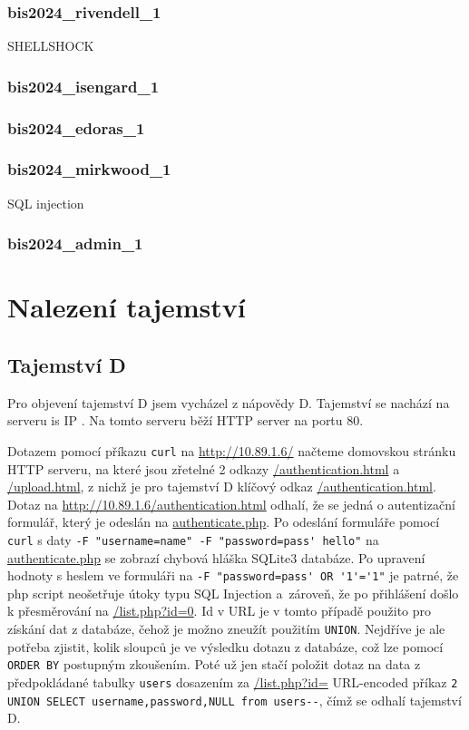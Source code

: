 \documentclass[a4paper, 11pt]{article}
\begin{document}
\subsubsection{bis2024\_rivendell\_1}

SHELLSHOCK

\subsubsection{bis2024\_isengard\_1}
\subsubsection{bis2024\_edoras\_1}
\subsubsection{bis2024\_mirkwood\_1} 

SQL injection


\subsubsection{bis2024\_admin\_1}



\section{Nalezení tajemství}
\subsection{Tajemství D}
Pro objevení tajemství D jsem vycházel z nápovědy D. Tajemství se nachází na serveru  is IP . Na tomto serveru běží HTTP server na portu 80. 

Dotazem pomocí příkazu \texttt{curl} na \url{http://10.89.1.6/} načteme domovskou stránku HTTP serveru, na které jsou zřetelné 2 odkazy \url{/authentication.html} a \url{/upload.html}, z nichž je pro tajemství D klíčový odkaz \url{/authentication.html}. Dotaz na \url{http://10.89.1.6/authentication.html} odhalí, že se jedná o autentizační formulář, který je odeslán na \url{authenticate.php}. Po odeslání formuláře pomocí \texttt{curl} s daty \verb|-F "username=name" -F "password=pass' hello"| na \url{authenticate.php} se zobrazí chybová hláška SQLite3 databáze. Po upravení hodnoty s heslem ve formuláři na \linebreak \verb|-F "password=pass' OR '1'='1"| je patrné, že php script neošetřuje útoky typu SQL Injection a~zároveň, že po přihlášení došlo k přesměrování na \url{/list.php?id=0}. Id v URL je v tomto případě použito pro získání dat z databáze, čehož je možno zneužít použitím \verb|UNION|. Nejdříve je ale potřeba zjistit, kolik sloupců je ve výsledku dotazu z databáze, což lze pomocí \verb|ORDER BY| postupným zkoušením. Poté už jen stačí položit dotaz na data z předpokládané tabulky \verb|users| dosazením za \url{/list.php?id=} URL-encoded příkaz \linebreak \verb|2 UNION SELECT username,password,NULL from users--|, čímž se odhalí tajemství D.
\end{document}

